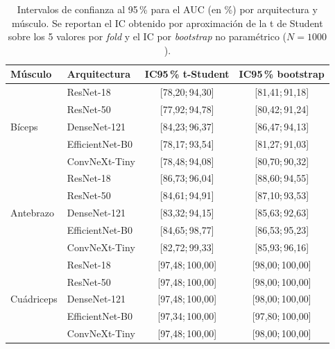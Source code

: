 \documentclass[12pt]{extarticle}
\numberwithin{equation}{section}
\begin{document}
\begin{refsection}
\begin{table}[h!]
\centering
\caption{Intervalos de confianza al 95\,\% para el AUC (en \%) por arquitectura y músculo. Se reportan el IC obtenido por aproximación de la t de Student sobre los 5 valores por \textit{fold} y el IC por \textit{bootstrap} no paramétrico ($N=1000$).}
\label{tab:auc-ci}
\small
\begin{tabular}{llcc}
\toprule
\textbf{Músculo} & \textbf{Arquitectura} & \textbf{IC95\,\% t-Student} & \textbf{IC95\,\% bootstrap} \\
\midrule
\multirow{5}{*}{Bíceps}     & ResNet-18       & [78{,}20;\,94{,}30]   & [81{,}41;\,91{,}18] \\
                            & ResNet-50       & [77{,}92;\,94{,}78]   & [80{,}42;\,91{,}24] \\
                            & DenseNet-121    & [84{,}23;\,96{,}37]   & [86{,}47;\,94{,}13] \\
                            & EfficientNet-B0 & [78{,}17;\,93{,}54]   & [81{,}27;\,91{,}03] \\
                            & ConvNeXt-Tiny   & [78{,}48;\,94{,}08]   & [80{,}70;\,90{,}32] \\
\midrule
\multirow{5}{*}{Antebrazo}  & ResNet-18       & [86{,}73;\,96{,}04]   & [88{,}60;\,94{,}55] \\
                            & ResNet-50       & [84{,}61;\,94{,}91]   & [87{,}10;\,93{,}53] \\
                            & DenseNet-121    & [83{,}32;\,94{,}15]   & [85{,}63;\,92{,}63] \\
                            & EfficientNet-B0 & [84{,}65;\,98{,}77]   & [86{,}53;\,95{,}23] \\
                            & ConvNeXt-Tiny   & [82{,}72;\,99{,}33]   & [85{,}93;\,96{,}16] \\
\midrule
\multirow{5}{*}{Cuádriceps} & ResNet-18       & [97{,}48;\,100{,}00]  & [98{,}00;\,100{,}00] \\
                            & ResNet-50       & [97{,}48;\,100{,}00]  & [98{,}00;\,100{,}00] \\
                            & DenseNet-121    & [97{,}48;\,100{,}00]  & [98{,}00;\,100{,}00] \\
                            & EfficientNet-B0 & [97{,}34;\,100{,}00]  & [97{,}80;\,100{,}00] \\
                            & ConvNeXt-Tiny   & [97{,}48;\,100{,}00]  & [98{,}00;\,100{,}00] \\

\end{tabular}
\end{table}
\end{refsection}
\end{document}
